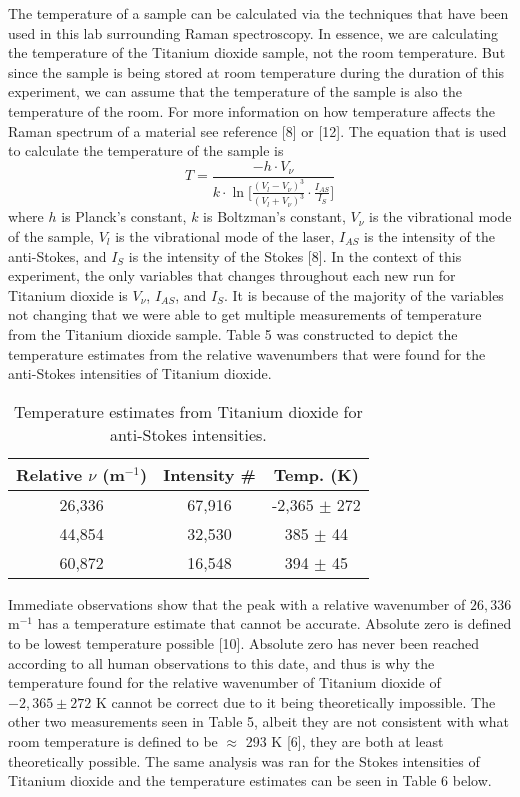 \documentclass[twocolumn]{article}
\begin{document}
The temperature of a sample can be calculated via the techniques that have been used in this lab surrounding Raman spectroscopy. In essence, we are calculating the temperature of the Titanium dioxide sample, not the room temperature. But since the sample is being stored at room temperature during the duration of this experiment, we can assume that the temperature of the sample is also the temperature of the room. For more information on how temperature affects the Raman spectrum of a material see reference [8] or [12]. The equation that is used to calculate the temperature of the sample is 
\begin{equation}\label{1}
	T=\frac{-h\cdot V_{\nu}}{k\cdot\ln{[\frac{(V_{l}-V_{\nu})^{3}}{(V_{l}+V_{\nu})^{3}}\cdot\frac{I_{AS}}{I_{S}}}]}
\end{equation}
where $h$ is Planck's constant, $k$ is Boltzman's constant, $V_{\nu}$ is the vibrational mode of the sample, $V_{l}$ is the vibrational mode of the laser, $I_{AS}$ is the intensity of the anti-Stokes, and $I_{S}$ is the intensity of the Stokes [8]. In the context of this experiment, the only variables that changes throughout each new run for Titanium dioxide is $V_{\nu}$, $I_{AS}$, and $I_{S}$. It is because of the majority of the variables not changing that we were able to get multiple measurements of temperature from the Titanium dioxide sample. Table 5 was constructed to depict the temperature estimates from the relative wavenumbers that were found for the anti-Stokes intensities of Titanium dioxide.
 \begin{table}[htp]
\begin{center}
\begin{tabular}{|c|c|c|}
	\hline \textbf{Relative $\nu$ (m$^{-1}$)} & \textbf{Intensity \#} & \textbf{Temp. (K)} \\ \hline
	26,336 & 67,916 & -2,365 $\pm$ 272 \\ \hline
	44,854 & 32,530 & 385 $\pm$ 44 \\ \hline
	60,872 & 16,548 & 394 $\pm$ 45 \\ \hline
\end{tabular}
\caption{Temperature estimates from Titanium dioxide for anti-Stokes intensities.}
\end{center}
\label{default}
\end{table}%
\newline
Immediate observations show that the peak with a relative wavenumber of $26,336$ m$^{-1}$ has a temperature estimate that cannot be accurate. Absolute zero is defined to be lowest temperature possible [10]. Absolute zero has never been reached according to all human observations to this date, and thus is why the temperature found for the relative wavenumber of Titanium dioxide of $-2,365 \pm 272$ K cannot be correct due to it being theoretically impossible. The other two measurements seen in Table 5, albeit they are not consistent with what room temperature is defined to be $\approx$ 293 K [6], they are both at least theoretically possible. The same analysis was ran for the Stokes intensities of Titanium dioxide and the temperature estimates can be seen in Table 6 below.
\end{document}
